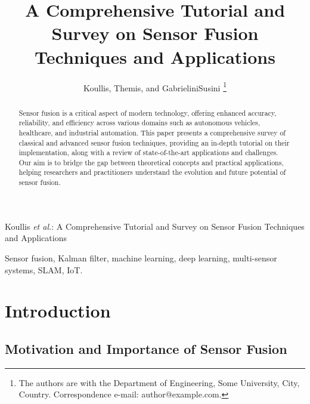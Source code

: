 \documentclass[journal]{IEEEtran}
\title{A Comprehensive Tutorial and Survey on Sensor Fusion Techniques and Applications}
\author{Koullis, Themis, and GabrieliniSusini%
\thanks{The authors are with the Department of Engineering, Some University, City, Country. Correspondence e-mail: author@example.com.}%
}
\begin{document}
\maketitle

%
{Koullis \MakeLowercase{\textit{et al.}}: A Comprehensive Tutorial and Survey on Sensor Fusion Techniques and Applications}

\begin{abstract}
Sensor fusion is a critical aspect of modern technology, offering enhanced accuracy, reliability, and efficiency across various domains such as autonomous vehicles, healthcare, and industrial automation. This paper presents a comprehensive survey of classical and advanced sensor fusion techniques, providing an in-depth tutorial on their implementation, along with a review of state-of-the-art applications and challenges. Our aim is to bridge the gap between theoretical concepts and practical applications, helping researchers and practitioners understand the evolution and future potential of sensor fusion.
\end{abstract}

\begin{IEEEkeywords}
Sensor fusion, Kalman filter, machine learning, deep learning, multi-sensor systems, SLAM, IoT.
\end{IEEEkeywords}

\section{Introduction}

\subsection{Motivation and Importance of Sensor Fusion}
\end{document}
